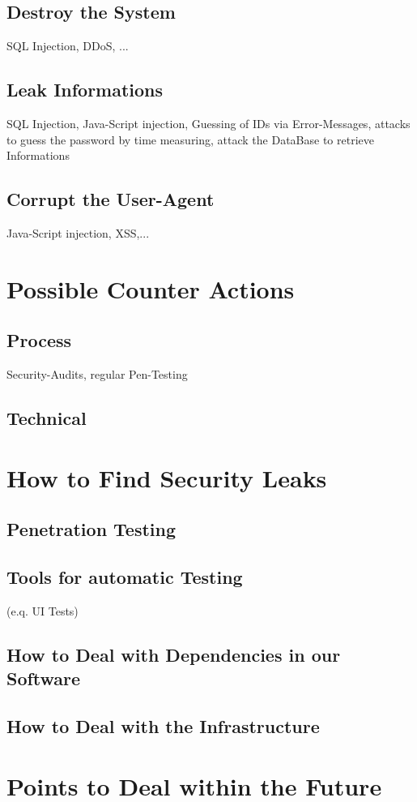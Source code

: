 \subsection{Destroy the System}
SQL Injection, DDoS, ...

\subsection{Leak Informations}
SQL Injection, Java-Script injection, Guessing of IDs via Error-Messages, 
attacks to guess the password by time measuring, attack the DataBase to retrieve Informations

\subsection{Corrupt the User-Agent}
Java-Script injection, XSS,...

\section{Possible Counter Actions}

\subsection{Process}
Security-Audits, regular Pen-Testing

\subsection{Technical}

\section{How to Find Security Leaks}


\subsection{Penetration Testing}


\subsection{Tools for automatic Testing}
(e.q. UI Tests)


\subsection{How to Deal with Dependencies in our Software}
\subsection{How to Deal with the Infrastructure}
\section{Points to Deal within the Future}
